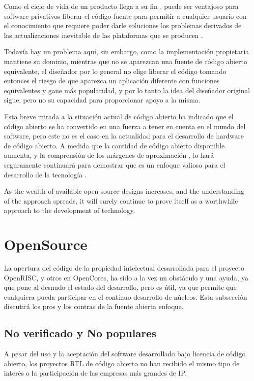 Como el ciclo de vida de un producto llega a su fin , puede ser ventajoso para software privativos liberar el código fuente para permitir a cualquier usuario con el conocimiento que requiere poder darle soluciones los problemas derivados de las actualizaciones inevitable de las plataformas que se producen . 

Todavía hay un problema aquí, sin embargo, como la implementación propietaria
mantiene su dominio, mientras que no se aparezcan una fuente de código abierto equivalente, el diseñador por lo general no elige liberar el código tomando entonces el riesgo de que aparezca un aplicación diferente con funciones equivalentes y gane más popularidad,  y por lo tanto la idea del diseñador original sigue, pero no su capacidad para proporcionar apoyo a la misma.

Esta breve mirada a la situación actual de código abierto ha indicado que el código abierto
se ha convertido en una fuerza a tener en cuenta en el mundo del software, pero este no es el caso en la actualidad para el desarrollo de hardware de código abierto.
 A medida que la cantidad de código abierto disponible aumenta, y la comprensión de los márgenes de aproximación , lo hará
seguramente continuará para demostrar que es un enfoque valioso para el desarrollo de
la tecnología .

As the wealth of available open source designs increases, and the understanding of the approach spreads, it will surely continue to prove itself as a worthwhile approach to the development of technology.

\section{ OpenSource}

La apertura del código de la propiedad intelectual desarrollada para el proyecto OpenRISC, y otros en OpenCores, ha sido a la vez un obstáculo y una ayuda, ya que pone al desnudo el estado del desarrollo, pero es útil, ya que permite que cualquiera pueda participar en el continuo desarrollo de núcleos. Esta subsección discutirá los pros y los contras de la fuente abierta enfoque.

		\subsection{No verificado y No populares}

A pesar del uso y la aceptación del software desarrollado bajo licencia de código abierto, los proyectos RTL de código abierto no han recibido el mismo tipo de interés o la participación de las empresas más grandes de IP. 


